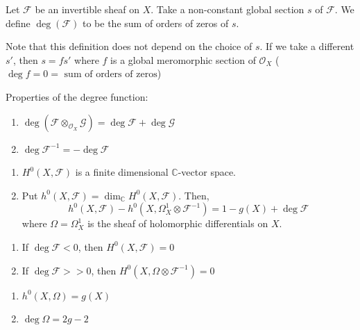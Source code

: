 \documentclass[oneside, 12pt]{scrbook}
\newcommand{\CC}{\mathbb C}
\theoremstyle{theorem}
\begin{document}
\begin{definition}
Let $\mathcal{F}$ be an invertible sheaf on $X$. Take a non-constant global section $s$ of $\mathcal{F}$. We define $\deg(\mathcal{F})$ to be the sum of orders of zeros of $s$. 
\end{definition}

\begin{remark}
Note that this definition does not depend on the choice of $s$. If we take a different $s'$, then $s = fs'$ where $f$ is a global meromorphic section of $\mathcal{O}_{X}$ ($\deg f = 0 = \text{ sum of orders of zeros}$)
\end{remark}

\begin{proposition}
Properties of the degree function:
\begin{enumerate}
\item $\deg(\mathcal{F} \otimes_{\mathcal{O}_{X}} \mathcal{G}) = \deg \mathcal{F} + \deg \mathcal{G}$
\item $\deg \mathcal{F}^{-1} = - \deg \mathcal{F}$
\end{enumerate}
\end{proposition}

\begin{theorem}
\begin{enumerate}
\item $H^{0}(X, \mathcal{F})$ is a finite dimensional $\CC$-vector space.
\item Put $h^{0}(X,\mathcal{F}) = \dim_{\CC}H^{0} (X, \mathcal{F})$. Then, $$h^{0}(X, \mathcal{F}) - h^{0}(X, \Omega_{X}^{1} \otimes \mathcal{F}^{-1}) = 1- g(X) + \deg \mathcal{F}$$ where $\Omega = \Omega_{X}^{1}$ is the sheaf of holomorphic differentials on $X$.
\end{enumerate}
\end{theorem}

\begin{remark}[Facts]
\begin{enumerate}
\item If $\deg \mathcal{F} < 0$, then $H^{0}(X, \mathcal{F})=0$ 
\item If $\deg \mathcal{F} >>0$, then $H^{0}(X, \Omega \otimes \mathcal{F}^{-1})=0$
\end{enumerate}
\end{remark}

\begin{lemma}
\begin{enumerate}
\item $h^{0}(X, \Omega) = g(X)$
\item $\deg \Omega = 2g-2$
\end{enumerate}
\end{lemma}
\end{document}
